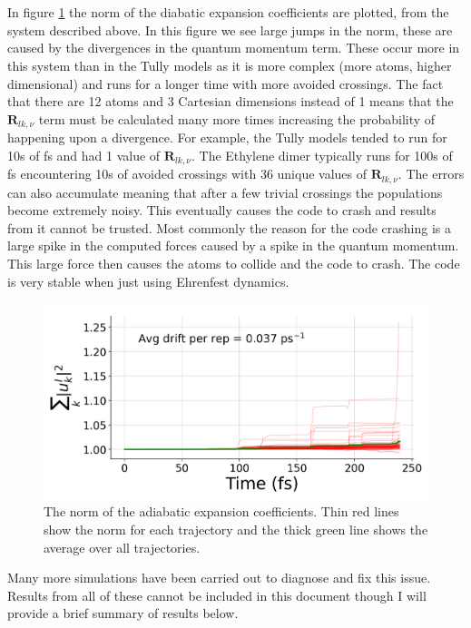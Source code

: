 \\\\
In figure \ref{fig:CP2K_norm} the norm of the diabatic expansion coefficients are plotted, from the system described above. In this figure we see large jumps in the norm, these are caused by the divergences in the quantum momentum term. These occur more in this system than in the Tully models as it is more complex (more atoms, higher dimensional) and runs for a longer time with more avoided crossings. The fact that there are 12 atoms and 3 Cartesian dimensions instead of 1 means that the $\mathbf{R}_{lk, \nu}$ term must be calculated many more times increasing the probability of happening upon a divergence. For example, the Tully models tended to run for 10s of fs and had 1 value of $\mathbf{R}_{lk, \nu}$. The Ethylene dimer typically runs for 100s of fs encountering 10s of avoided crossings with 36 unique values of $\mathbf{R}_{lk, \nu}$. The errors can also accumulate meaning that after a few trivial crossings the populations become extremely noisy. This eventually causes the code to crash and results from it cannot be trusted. Most commonly the reason for the code crashing is a large spike in the computed forces caused by a spike in the quantum momentum. This large force then causes the atoms to collide and the code to crash. The code is very stable when just using Ehrenfest dynamics.
\begin{figure}[ht]
  \includegraphics[width=\textwidth]{../img/CTMQC/Ethylene_norm.png}
  \caption{\label{fig:CP2K_norm}The norm of the adiabatic expansion coefficients. Thin red lines show the norm for each trajectory and the thick green line shows the average over all trajectories.}
\end{figure}
Many more simulations have been carried out to diagnose and fix this issue. Results from all of these cannot be included in this document though I will provide a brief summary of results below.
